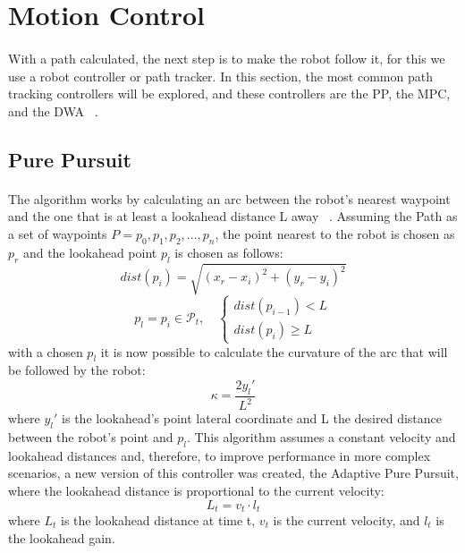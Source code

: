 \section{Motion Control}
\label{sec:MC}
\paragraph{}With a path calculated, the next step is to make the robot follow it, for this we use a robot controller or path tracker. In this section,
 the most common path tracking controllers will be explored, and these controllers are the \gls{PP}, the \gls{MPC}, and the \gls{DWA} ~\cite{macenski2023regulated}.

\subsection{Pure Pursuit}
\label{subsec:PP}
\paragraph{}The algorithm works by calculating an arc between the robot's nearest waypoint and the one that is at least a 
lookahead distance L away ~\cite{macenski2023regulated}. Assuming the Path as a set of waypoints $P = {p_0,p_1, p_2, ..., p_n}$, the point nearest to the robot is chosen 
as $p_r$ and the lookahead point $p_l$ is chosen as follows:
\begin{equation}
    dist(p_i) = \sqrt{(x_r - x_i)^2 + (y_r - y_i)^2}
\end{equation}
\begin{equation}
    p_l = p_i \in \mathcal{P}_t, \quad
    \begin{cases}
        dist(p_{i-1}) < L \\
        dist(p_i) \geq L
    \end{cases}
\end{equation}
with a chosen $p_l$ it is now possible to calculate the curvature of the arc that will be followed by the robot:
\begin{equation}
    \kappa = \frac{2y_l'}{L^2}
\end{equation}
where $y_l'$ is the lookahead's point lateral coordinate and L the desired distance between the robot's point and $p_l$. 
This algorithm assumes a constant velocity and lookahead distances and, therefore, to improve performance in more 
complex scenarios, a new version of this controller was created, the Adaptive Pure Pursuit, where  
the lookahead distance is proportional to the current velocity:
\begin{equation}
    L_t = v_t \cdot l_t
\end{equation}
where $L_t$ is the lookahead distance at time t, $v_t$ is the current velocity, and $l_t$ is the lookahead gain.
